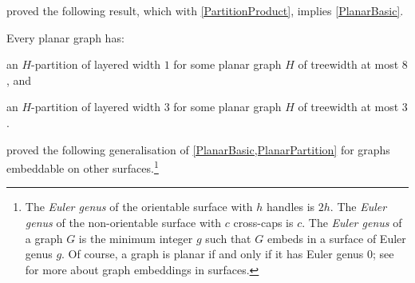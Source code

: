 \documentclass{patmorin}
\begin{document}
\citet{dujmovic.joret.ea:planar} proved the following result, which with \cref{PartitionProduct}, implies \cref{PlanarBasic}. 

\begin{thm}
\label{PlanarPartition}
Every planar graph has:
\begin{compactitem}
\item an $H$-partition of layered width $1$ for some planar graph $H$ of treewidth at most $8$, and
\item an $H$-partition of layered width $3$ for some planar graph $H$ of treewidth at most $3$.
\end{compactitem}
\end{thm}




\citet{dujmovic.joret.ea:planar} proved the following generalisation of \cref{PlanarBasic,PlanarPartition} for graphs embeddable on other surfaces.\footnote{The \textit{Euler genus} of the orientable surface with $h$ handles is $2h$. The \textit{Euler genus} of the non-orientable surface with $c$ cross-caps is $c$. The \textit{Euler genus} of a graph $G$ is the minimum integer $g$ such that $G$ embeds in a surface of Euler genus $g$. Of course, a graph is planar if and only if it has Euler genus 0; see \citep{mohar.thomassen:graphs} for more about graph embeddings in surfaces.}
\end{document}
